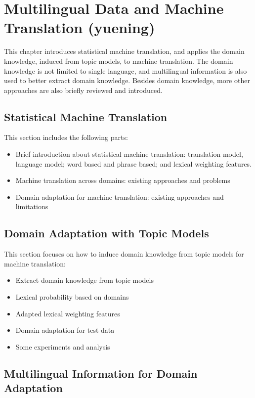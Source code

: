 \chapter{Multilingual Data and Machine Translation (yuening)}
\label{ch:mt}

This chapter introduces statistical machine translation, and applies the domain knowledge, induced from topic models, to machine translation. The domain knowledge is not limited to single language, and multilingual information is also used to better extract domain knowledge. Besides domain knowledge, more other approaches are also briefly reviewed and introduced.

\section{Statistical Machine Translation}

This section includes the following parts:
\begin{itemize}
\item Brief introduction about statistical machine translation: translation model, language model; word based and phrase based; and lexical weighting features.
\item Machine translation across domains: existing approaches and problems
\item Domain adaptation for machine translation: existing approaches and limitations
\end{itemize}

\section{Domain Adaptation with Topic Models}

This section focuses on how to induce domain knowledge from topic models for machine translation: 
\begin{itemize}
\item Extract domain knowledge from topic models
\item Lexical probability based on domains
\item Adapted lexical weighting features
\item Domain adaptation for test data
\item Some experiments and analysis
\end{itemize}

\section{Multilingual Information for Domain Adaptation}

